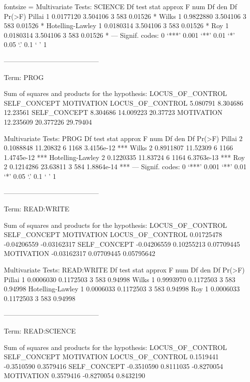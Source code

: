 \documentclass{article}
\begin{document}
\begin{enumerate}[leftmargin = 0 em, label = \arabic*., font = \bfseries]
\begin{enumerate}
\begin{rcode*}{fontsize = \footnotesize}
Multivariate Tests: SCIENCE
                 Df test stat approx F num Df den Df  Pr(>F)  
Pillai            1 0.0177120 3.504106      3    583 0.01526 *
Wilks             1 0.9822880 3.504106      3    583 0.01526 *
Hotelling-Lawley  1 0.0180314 3.504106      3    583 0.01526 *
Roy               1 0.0180314 3.504106      3    583 0.01526 *
---
Signif. codes:  0 ‘***’ 0.001 ‘**’ 0.01 ‘*’ 0.05 ‘.’ 0.1 ‘ ’ 1

------------------------------------------
 
Term: PROG 

Sum of squares and products for the hypothesis:
                 LOCUS_OF_CONTROL SELF_CONCEPT MOTIVATION
LOCUS_OF_CONTROL         5.080791     8.304686   12.23561
SELF_CONCEPT             8.304686    14.009223   20.37723
MOTIVATION              12.235609    20.377226   29.79404

Multivariate Tests: PROG
                 Df test stat approx F num Df den Df     Pr(>F)    
Pillai            2 0.1088848 11.20832      6   1168 3.4156e-12 ***
Wilks             2 0.8911807 11.52309      6   1166 1.4745e-12 ***
Hotelling-Lawley  2 0.1220335 11.83724      6   1164 6.3763e-13 ***
Roy               2 0.1214286 23.63811      3    584 1.8864e-14 ***
---
Signif. codes:  0 ‘***’ 0.001 ‘**’ 0.01 ‘*’ 0.05 ‘.’ 0.1 ‘ ’ 1

------------------------------------------
 
Term: READ:WRITE 

Sum of squares and products for the hypothesis:
                 LOCUS_OF_CONTROL SELF_CONCEPT  MOTIVATION
LOCUS_OF_CONTROL       0.01725478  -0.04206559 -0.03162317
SELF_CONCEPT          -0.04206559   0.10255213  0.07709445
MOTIVATION            -0.03162317   0.07709445  0.05795642

Multivariate Tests: READ:WRITE
                 Df test stat  approx F num Df den Df  Pr(>F)
Pillai            1 0.0006030 0.1172503      3    583 0.94998
Wilks             1 0.9993970 0.1172503      3    583 0.94998
Hotelling-Lawley  1 0.0006033 0.1172503      3    583 0.94998
Roy               1 0.0006033 0.1172503      3    583 0.94998

------------------------------------------
 
Term: READ:SCIENCE 

Sum of squares and products for the hypothesis:
                 LOCUS_OF_CONTROL SELF_CONCEPT MOTIVATION
LOCUS_OF_CONTROL        0.1519441   -0.3510590  0.3579416
SELF_CONCEPT           -0.3510590    0.8111035 -0.8270054
MOTIVATION              0.3579416   -0.8270054  0.8432190


\end{rcode*}
\end{enumerate}
\end{enumerate}
\end{document}
